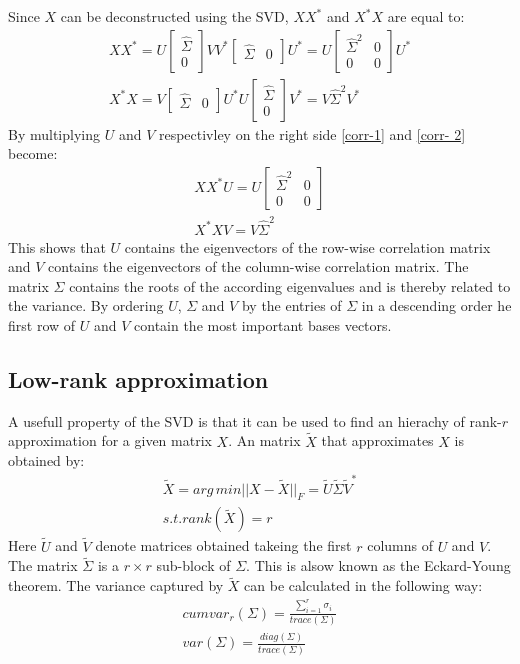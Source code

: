 Since \(X\) can be deconstructed using the SVD, \(XX^{*}\) and \(X^{*}X\) are equal to:
\begin{gather}
XX^{*} = U\begin{bmatrix}
\hat{\Sigma} \\
0
\end{bmatrix}VV^{*}\begin{bmatrix}
\hat{\Sigma} & 0
\end{bmatrix}U^{*} = U \begin{bmatrix}
\hat{\Sigma}^{2} & 0 \\
0 & 0
\end{bmatrix} U^{*} \label{corr-1}\\
X^{*}X = V \begin{bmatrix}
\hat{\Sigma} & 0
\end{bmatrix} U^{*}U \begin{bmatrix}
\hat{\Sigma} \\
0
\end{bmatrix} V^{*} = V\hat{\Sigma}^{2}V^{*} \label{corr- 2}
\end{gather}
By multiplying \(U\) and \(V\) respectivley on the right side \ref{corr-1} and \ref{corr- 2} become:
\begin{gather}
XX^{*}U = U \begin{bmatrix}
\hat{\Sigma}^{2} & 0 \\
0 & 0
\end{bmatrix} \\
X^{*}XV = V\hat{\Sigma}^{2}
\end{gather}
This shows that \(U\) contains the eigenvectors of the row-wise correlation matrix and \(V\) contains the eigenvectors of the column-wise correlation matrix.
The matrix \(\Sigma\) contains the roots of the according eigenvalues and is thereby related to the variance.
By ordering \(U\), \(\Sigma\) and \(V\) by the entries of \(\Sigma\) in a descending order he first row of \(U\) and \(V\) contain the most important bases vectors. \cite{brunton_kutz_2019}

\subsection{Low-rank approximation}
A usefull property of the SVD is that it can be used to find an hierachy of rank-\(r\) approximation for a given matrix \(X\).
An matrix \(\tilde{X}\) that approximates \(X\) is obtained by:
\begin{gather}
\tilde{X} = arg\,min ||X - \tilde{X}||_F = \tilde{U}\tilde{\Sigma}\tilde{V}^{*}	\\
s.t. rank(\tilde{X}) = r
\end{gather}	
Here  \(\tilde{U}\) and \(\tilde{V}\) denote matrices obtained takeing the first \(r\) columns of \(U\) and \(V\). The matrix \(\tilde{\Sigma}\) is a \(r \times r\) sub-block of \(\Sigma\).
This is alsow known as the Eckard-Young theorem.
The variance captured by \(\tilde{X}\) can be calculated in the following way:
\begin{gather}
cumvar_{r}(\Sigma) = \frac{\sum_{i = 1}^{r} \sigma_i}{trace(\Sigma)} \label{cum-var-r} \\
var(\Sigma) = \frac{diag(\Sigma)}{trace(\Sigma)} \label{var-sig}
\end{gather}
\cite{brunton_kutz_2019}
